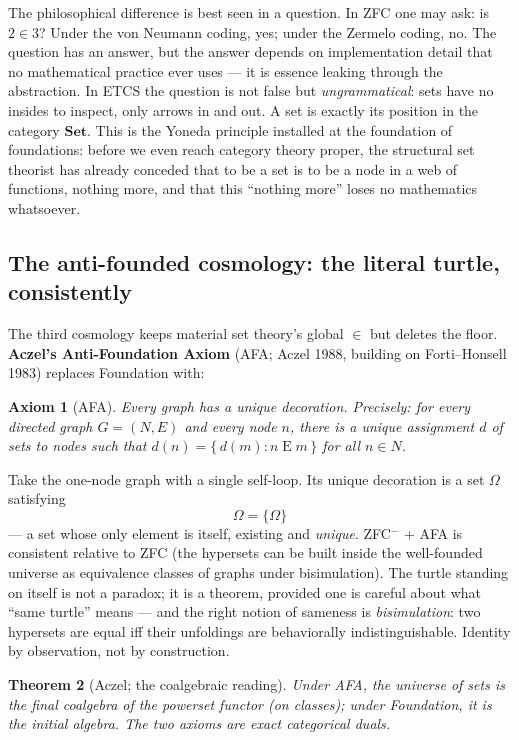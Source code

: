 \documentclass[11pt]{article}
\theoremstyle{plain}
\newtheorem{theorem}{Theorem}[section]
\newtheorem{axiom}[theorem]{Axiom}
\theoremstyle{definition}
\theoremstyle{remark}
\newcommand{\Set}{\mathbf{Set}}
\begin{document}
The philosophical difference is best seen in a question. In ZFC one may ask: is $2 \in 3$? Under the von Neumann coding, yes; under the Zermelo coding, no. The question has an answer, but the answer depends on implementation detail that no mathematical practice ever uses --- it is essence leaking through the abstraction. In ETCS the question is not false but \emph{ungrammatical}: sets have no insides to inspect, only arrows in and out. A set is exactly its position in the category $\Set$. This is the Yoneda principle installed at the foundation of foundations: before we even reach category theory proper, the structural set theorist has already conceded that to be a set is to be a node in a web of functions, nothing more, and that this ``nothing more'' loses no mathematics whatsoever.

\subsection{The anti-founded cosmology: the literal turtle, consistently}

The third cosmology keeps material set theory's global $\in$ but deletes the floor. \textbf{Aczel's Anti-Foundation Axiom} (AFA; Aczel 1988, building on Forti--Honsell 1983) replaces Foundation with:

\begin{axiom}[AFA]
Every graph has a unique decoration. Precisely: for every directed graph $G = (N, E)$ and every node $n$, there is a unique assignment $d$ of sets to nodes such that $d(n) = \{\, d(m) : n \mathrel{E} m \,\}$ for all $n \in N$.
\end{axiom}

Take the one-node graph with a single self-loop. Its unique decoration is a set $\Omega$ satisfying
\[
\Omega = \{\Omega\}
\]
--- a set whose only element is itself, existing and \emph{unique}. ZFC$^-$ + AFA is consistent relative to ZFC (the hypersets can be built inside the well-founded universe as equivalence classes of graphs under bisimulation). The turtle standing on itself is not a paradox; it is a theorem, provided one is careful about what ``same turtle'' means --- and the right notion of sameness is \emph{bisimulation}: two hypersets are equal iff their unfoldings are behaviorally indistinguishable. Identity by observation, not by construction.

\begin{theorem}[Aczel; the coalgebraic reading]\label{thm:afa}
Under AFA, the universe of sets is the \emph{final coalgebra} of the powerset functor (on classes); under Foundation, it is the \emph{initial algebra}. The two axioms are exact categorical duals.
\end{theorem}
\end{document}
